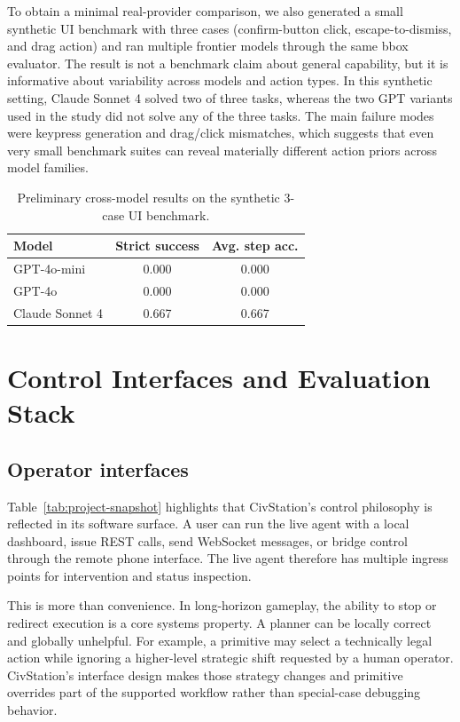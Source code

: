 To obtain a minimal real-provider comparison, we also generated a small synthetic UI benchmark with three cases (confirm-button click, escape-to-dismiss, and drag action) and ran multiple frontier models through the same bbox evaluator. The result is not a benchmark claim about general capability, but it is informative about variability across models and action types. In this synthetic setting, Claude Sonnet 4 solved two of three tasks, whereas the two GPT variants used in the study did not solve any of the three tasks. The main failure modes were keypress generation and drag/click mismatches, which suggests that even very small benchmark suites can reveal materially different action priors across model families.

\begin{table}[t]
\centering
\caption{Preliminary cross-model results on the synthetic 3-case UI benchmark.}
\label{tab:cross-model}
\begin{tabular}{lcc}
\toprule
\textbf{Model} & \textbf{Strict success} & \textbf{Avg. step acc.} \\
\midrule
GPT-4o-mini & 0.000 & 0.000 \\
GPT-4o & 0.000 & 0.000 \\
Claude Sonnet 4 & 0.667 & 0.667 \\
\bottomrule
\end{tabular}
\end{table}

\section{Control Interfaces and Evaluation Stack}

\subsection{Operator interfaces}

Table~\ref{tab:project-snapshot} highlights that CivStation's control philosophy is reflected in its software surface. A user can run the live agent with a local dashboard, issue REST calls, send WebSocket messages, or bridge control through the remote phone interface. The live agent therefore has multiple ingress points for intervention and status inspection.

This is more than convenience. In long-horizon gameplay, the ability to stop or redirect execution is a core systems property. A planner can be locally correct and globally unhelpful. For example, a primitive may select a technically legal action while ignoring a higher-level strategic shift requested by a human operator. CivStation's interface design makes those strategy changes and primitive overrides part of the supported workflow rather than special-case debugging behavior.

